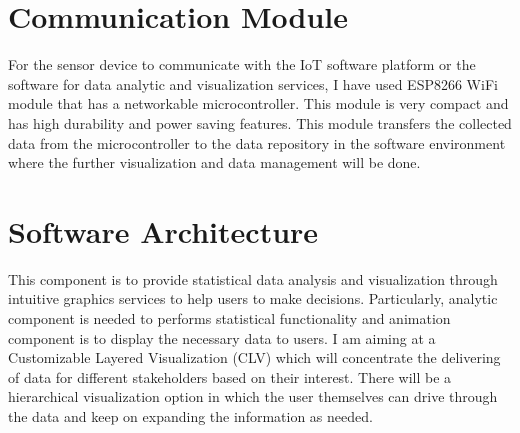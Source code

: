 \documentclass[11pt]{article}
\begin{document}
 \section*{Communication Module}

    For the sensor device to communicate with the IoT software platform  or the software for data analytic and visualization services, I have used ESP8266 WiFi module that has a networkable microcontroller. This module is very compact and has high durability and power saving features. This module transfers the collected data from the microcontroller to the data repository in the software environment where the further visualization and data management will be done.
    

      
 \section*{Software Architecture}
 
 This component is to provide statistical data analysis and visualization through intuitive graphics services to help users to make decisions. Particularly, analytic component is needed to performs statistical functionality and animation component is to display the necessary data to users. I am aiming at a Customizable Layered Visualization (CLV) which will concentrate the delivering of data for different stakeholders based on their interest. There will be a hierarchical visualization option in which the user themselves can drive through the data and keep on expanding the information as needed.


    


\end{document}
